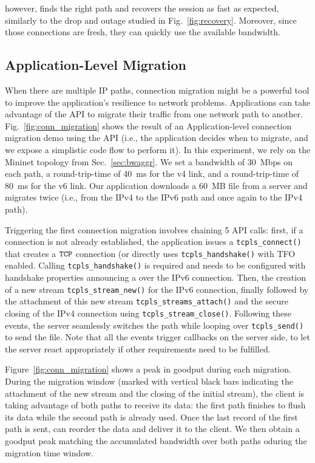 \tcpls however, finds the right path and recovers the session as fast as
expected, similarly to the drop and \rst outage studied in Fig.~\ref{fig:recovery}. Moreover, since those connections are fresh, they can quickly use the available bandwidth.

\subsection{Application-Level Migration}

When there are multiple IP paths, connection migration might be a
powerful tool to improve the application's resilience to network problems. Applications
can take advantage of the \tcpls API to migrate their traffic from one network
path to another.
Fig.~\ref{fig:conn_migration} shows the result of an Application-level
connection migration demo using the API (i.e., the application
decides when to migrate, and we expose a simplistic code flow to perform it).
In this experiment, we rely on the Mininet topology from Sec.~\ref{sec:bwaggr}.
We set a
bandwidth of 30~Mbps on each path, a round-trip-time of 40~ms for the v4 link,
and a round-trip-time of 80~ms for the v6 link. Our application downloads
a 60~MB file from a server and migrates twice (i.e., from the IPv4 to the IPv6 path
and once again to the IPv4 path).

Triggering the first connection migration involves chaining 5 API calls: first,
if a \tcp connection is not already established, the application issues a
\texttt{tcpls\_connect()} that creates a $\texttt{TCP}$ connection (or directly uses
\texttt{tcpls\_handshake()} with TFO enabled. Calling \texttt{tcpls\_handshake()}
is required and needs to be configured with handshake properties announcing a
\join over the IPv6 connection. Then, the creation of a new stream
\texttt{tcpls\_stream\_new()} for the IPv6 connection, finally followed by the
attachment of this new stream \texttt{tcpls\_streams\_attach()} and the secure
closing of the IPv4 \tcp connection using \texttt{tcpls\_stream\_close()}.
Following these events, the server seamlessly switches the path while looping
over \texttt{tcpls\_send()} to send the file. Note that all the events
trigger callbacks on the server side, to let the server react appropriately if
other requirements need to be fulfilled.

Figure~\ref{fig:conn_migration} shows a peak in goodput during each
migration. During the migration window (marked with vertical black bars
indicating the attachment of the new stream and the closing of the initial
stream), the client is taking advantage of both paths to receive its data: the
first path finishes to flush its data while the second path is already used.
Once the last record of the first path is sent, \tcpls can reorder the
data and deliver it to the client. We then obtain a goodput peak matching the
accumulated bandwidth over both paths oduring the migration time window.

